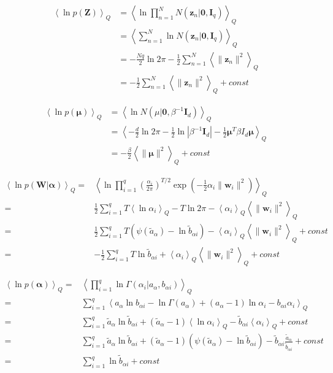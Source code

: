 \documentclass[10pt]{article}
\newcommand{\Angle}[1]{\left \langle #1 \right \rangle}
\newcommand{\Eq}[1]{\Angle{#1}_Q}
\newcommand{\Det}[1]{\left| #1 \right|}
\begin{document}
    \begin{align}
        \Eq{\ln{p(\bm{Z})}}&=\Eq{\ln{\prod_{n=1}^{N}{N(\bm{z}_n|\bm{0},\bm{I}_q)}}} \nonumber \\
        &=\Eq{\sum_{n=1}^{N}{\ln{N(\bm{z}_n|\bm{0},\bm{I}_q)}}} \nonumber \\
        &=-\frac{Nq}{2}\ln{2\pi}-\frac{1}{2}\sum_{n=1}^{N}{\Eq{\|\bm{z}_n\|^2}} \nonumber \\
        &=-\frac{1}{2}\sum_{n=1}^{N}{\Eq{\|\bm{z}_n\|^2}}+const
        \label{pz}
    \end{align}

    \begin{align}
        \Eq{\ln{p(\bm{\mu})}}&=\Eq{\ln{N(\mu|\bm{0},\beta^{-1}\bm{I}_d)}} \nonumber \\
        &=\Eq{-\frac{d}{2}\ln{2\pi}-\frac{1}{2}\ln{\Det{\beta^{-1}\bm{I}_d}}-\frac{1}{2}\bm{\mu}^T\beta I_d\bm{\mu}} \nonumber \\
        &=-\frac{\beta}{2}\Eq{\|\bm{\mu}\|^2}+const
        \label{pmu}
    \end{align}

    \begin{align}
        \Eq{\ln{p(\bm{W} \vert \bm{\alpha})}}=&\Eq{\ln{\prod_{i=1}^q \left( \frac{\alpha_i}{2\pi} \right)^{T/2} \exp \left( -\frac{1}{2}\alpha_i \| \bm{w}_i \|^2 \right) }} \nonumber \\
        =&\frac{1}{2}\sum_{i=1}^q T\Eq{\ln{\alpha_i}} - T\ln{2\pi} -\Eq{\alpha_i} \Eq{\| \bm{w}_i \|^2 } \nonumber \\
        =&\frac{1}{2}\sum_{i=1}^q T(\psi(\tilde{a}_\alpha)-\ln{\tilde{b}_{\alpha i}})-\Eq{\alpha_i} \Eq{\| \bm{w}_i \|^2 } + const \nonumber \\
        =&-\frac{1}{2}\sum_{i=1}^q T\ln{\tilde{b}_{\alpha i}}+\Eq{\alpha_i} \Eq{\| \bm{w}_i \|^2 } + const
        \label{pwalpha}
    \end{align}

    \begin{align}
        \Eq{\ln{p(\bm{\alpha})}}=&\Eq{\prod_{i=1}^q \ln \Gamma(\alpha_i \vert a_\alpha,b_{\alpha i})} \nonumber \\
        =&\sum_{i=1}^q \Eq{a_\alpha\ln{b_{\alpha i}}-\ln{\Gamma(a_\alpha)}+(a_\alpha-1)\ln{\alpha_i}-b_{\alpha i} \alpha_i} \nonumber \\
        =&\sum_{i=1}^q \tilde{a}_\alpha\ln{\tilde{b}_{\alpha i}}+(\tilde{a}_\alpha-1)\Eq{\ln{\alpha_i}}-\tilde{b}_{\alpha i}\Eq{\alpha_i} + const \nonumber \\
        =&\sum_{i=1}^q \tilde{a}_\alpha\ln{\tilde{b}_{\alpha i}}+(\tilde{a}_\alpha-1)(\psi(\tilde{a}_\alpha)-\ln{\tilde{b}_{\alpha i}})-\tilde{b}_{\alpha i}\frac{\tilde{a}_\alpha}{\tilde{b}_{\alpha i}} + const \nonumber \\
        =&\sum_{i=1}^q \ln{\tilde{b}_{\alpha i}} + const
        \label{palpha}
    \end{align}
\end{document}

